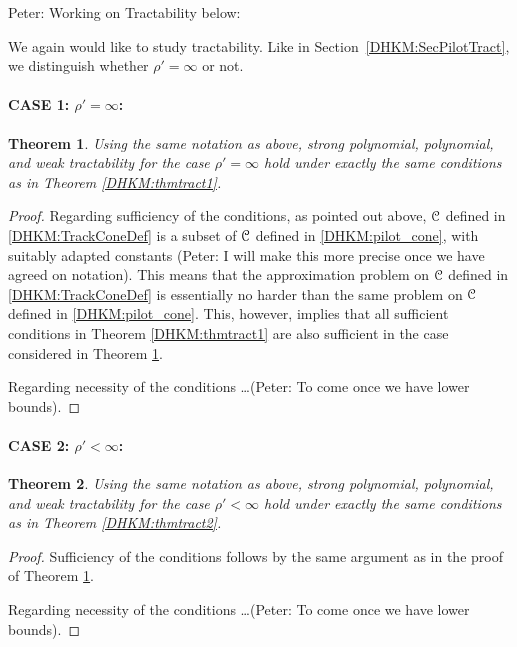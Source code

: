 \documentclass[USenglish]{article}
\theoremstyle{dgthm}
\newtheorem{theorem}{Theorem}
\theoremstyle{dgthm}
\theoremstyle{dgthm}
\theoremstyle{dgthm}
\theoremstyle{dgdef}
\theoremstyle{definition}
\newcommand{\PeterNote}[1]{{\color{orange}Peter: #1}}
\begin{document}
\medskip

\PeterNote{Working on Tractability below:

\bigskip

We again would like to study tractability. Like in Section~\ref{DHKM:SecPilotTract}, we distinguish whether $\rho'=\infty$ or not. 

\paragraph*{CASE 1: $\rho'=\infty$:}

\begin{theorem} \label{DHKM:thmtract3}
Using the same notation as above, strong polynomial, polynomial, and weak tractability for the case $\rho'=\infty$ hold under exactly the 
same conditions as in Theorem \ref{DHKM:thmtract1}.
\end{theorem}
\begin{proof}

Regarding sufficiency of the conditions, as pointed out above, ${\mathcal{C}}$ defined in \eqref{DHKM:TrackConeDef} is a subset of  ${\mathcal{C}}$ defined in \eqref{DHKM:pilot_cone}, with suitably adapted constants (\PeterNote{I will make this more precise once we have agreed on notation}). This means that the approximation problem on  ${\mathcal{C}}$ defined in \eqref{DHKM:TrackConeDef} is essentially no harder than the same problem on ${\mathcal{C}}$ defined in \eqref{DHKM:pilot_cone}. This, however, implies that all sufficient conditions in Theorem \ref{DHKM:thmtract1} are also sufficient in the case considered in Theorem \ref{DHKM:thmtract3}.

\medskip

Regarding necessity of the conditions \ldots (\PeterNote{To come once we have lower bounds}).

\end{proof}


\paragraph*{CASE 2: $\rho'<\infty$:} 

\begin{theorem} \label{DHKM:thmtract4}
Using the same notation as above, strong polynomial, polynomial, and weak tractability for the case $\rho'<\infty$ hold under exactly the 
same conditions as in Theorem \ref{DHKM:thmtract2}.
\end{theorem}
\begin{proof}
Sufficiency of the conditions follows by the same argument as in the proof of Theorem \ref{DHKM:thmtract3}.

\medskip

Regarding necessity of the conditions \ldots (\PeterNote{To come once we have lower bounds}).

\end{proof}

}
\end{document}
